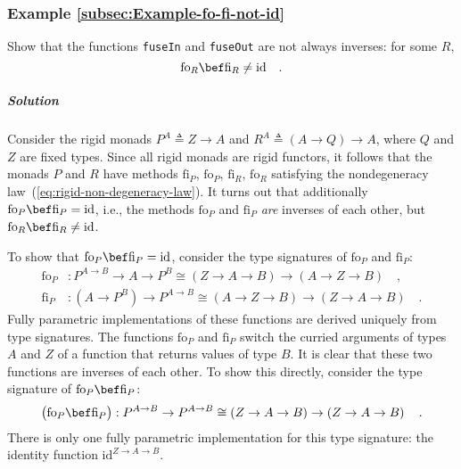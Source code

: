 \subsubsection{Example \label{subsec:Example-fo-fi-not-id}\ref{subsec:Example-fo-fi-not-id}}

Show that the functions \lstinline!fuseIn! and \lstinline!fuseOut!
are not always inverses: for some $R$,
\[
\text{fo}_{R}\bef\text{fi}_{R}\neq\text{id}\quad.
\]


\subparagraph{Solution}

Consider the rigid monads $P^{A}\triangleq Z\rightarrow A$ and $R^{A}\triangleq\left(A\rightarrow Q\right)\rightarrow A$,
where $Q$ and $Z$ are fixed types. Since all rigid monads are rigid
functors, it follows that the monads $P$ and $R$ have methods $\text{fi}_{P}$,
$\text{fo}_{P}$, $\text{fi}_{R}$, $\text{fo}_{R}$ satisfying the
nondegeneracy law~(\ref{eq:rigid-non-degeneracy-law}). It turns
out that additionally $\text{fo}_{P}\bef\text{fi}_{P}=\text{id}$,
i.e., the methods $\text{fo}_{P}$ and $\text{fi}_{P}$ \emph{are}
inverses of each other, but $\text{fo}_{R}\bef\text{fi}_{R}\neq\text{id}$.

To show that $\text{fo}_{P}\bef\text{fi}_{P}=\text{id}$, consider
the type signatures of $\text{fo}_{P}$ and $\text{fi}_{P}$:
\begin{align*}
\text{fo}_{P} & :P^{A\rightarrow B}\rightarrow A\rightarrow P^{B}\cong\left(Z\rightarrow A\rightarrow B\right)\rightarrow\left(A\rightarrow Z\rightarrow B\right)\quad,\\
\text{fi}_{P} & :(A\rightarrow P^{B})\rightarrow P^{A\rightarrow B}\cong\left(A\rightarrow Z\rightarrow B\right)\rightarrow\left(Z\rightarrow A\rightarrow B\right)\quad.
\end{align*}
Fully parametric implementations of these functions are derived uniquely
from type signatures. The functions $\text{fo}_{P}$ and $\text{fi}_{P}$
switch the curried arguments of types $A$ and $Z$ of a function
that returns values of type $B$. It is clear that these two functions
are inverses of each other. To show this directly, consider the type
signature of $\text{fo}_{P}\bef\text{fi}_{P}$:
\[
\big(\text{fo}_{P}\bef\text{fi}_{P}\big):P^{A\rightarrow B}\rightarrow P^{A\rightarrow B}\cong\left(Z\rightarrow A\rightarrow B\right)\rightarrow\left(Z\rightarrow A\rightarrow B\right)\quad.
\]
There is only one fully parametric implementation for this type signature:
the identity function $\text{id}^{Z\rightarrow A\rightarrow B}$.

